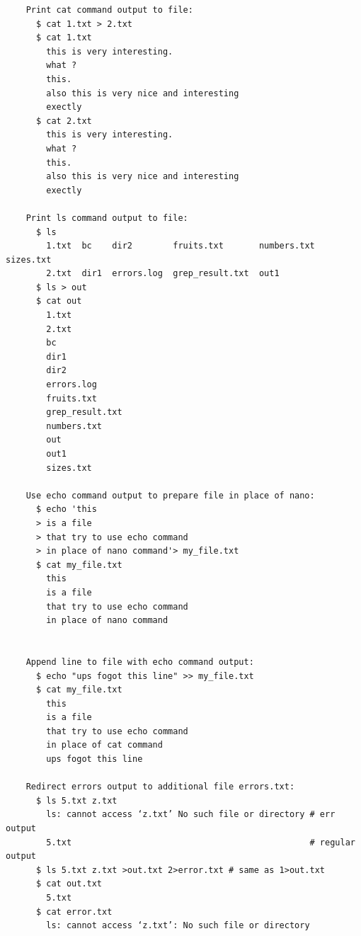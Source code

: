 \documentclass[a4paper,12pt]{article}
\begin{document}
\begin{verbatim}
    Print cat command output to file: 
      $ cat 1.txt > 2.txt
      $ cat 1.txt
        this is very interesting.
        what ?
        this.
        also this is very nice and interesting
        exectly
      $ cat 2.txt
        this is very interesting.
        what ?
        this.
        also this is very nice and interesting
        exectly 
     
    Print ls command output to file:  
      $ ls
        1.txt  bc    dir2        fruits.txt       numbers.txt  sizes.txt
        2.txt  dir1  errors.log  grep_result.txt  out1
      $ ls > out
      $ cat out
        1.txt
        2.txt
        bc
        dir1
        dir2
        errors.log
        fruits.txt
        grep_result.txt
        numbers.txt
        out
        out1
        sizes.txt
 
    Use echo command output to prepare file in place of nano: 
      $ echo 'this
      > is a file
      > that try to use echo command
      > in place of nano command'> my_file.txt
      $ cat my_file.txt 
        this
        is a file
        that try to use echo command
        in place of nano command


    Append line to file with echo command output: 
      $ echo "ups fogot this line" >> my_file.txt
      $ cat my_file.txt 
        this
        is a file
        that try to use echo command
        in place of cat command
        ups fogot this line
     
    Redirect errors output to additional file errors.txt:    
      $ ls 5.txt z.txt
	    ls: cannot access ‘z.txt’ No such file or directory # err output 
	    5.txt                                               # regular output
      $ ls 5.txt z.txt >out.txt 2>error.txt # same as 1>out.txt
      $ cat out.txt
	    5.txt
      $ cat error.txt
	    ls: cannot access ‘z.txt’: No such file or directory  
        
        
\end{verbatim}
\end{document}
